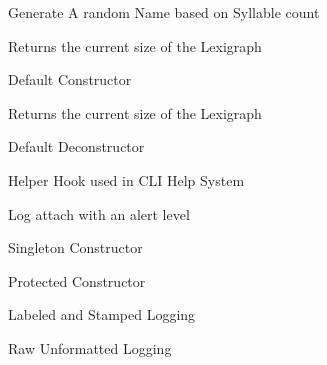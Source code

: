 \begin{DoxyRefList}
%
Generate A random Name based on Syllable count  
\item[Member \mbox{\hyperlink{classLexicon_afd43c6e75ae64e241631d6d8d4d47350}{Lexicon\+::get\+Lexigraph\+Size}} ()]\label{todo__todo000080}%
%
Returns the current size of the Lexigraph  
\item[Member \mbox{\hyperlink{classLexicon_aa62f83480879f9c6489633cb83a0736f}{Lexicon\+::Lexicon}} ()]\label{todo__todo000078}%
%
Default Constructor  
\item[Member \mbox{\hyperlink{classLexicon_a3b19ad271a38917ebb7547ea3e6586dc}{Lexicon\+::set\+Lexigraph}} (std\+::string)]\label{todo__todo000081}%
%
Returns the current size of the Lexigraph  
\item[Member \mbox{\hyperlink{classLexicon_a3c7224c29de2b05503992938986fd665}{Lexicon\+::$\sim$\+Lexicon}} ()]\label{todo__todo000082}%
%
Default Deconstructor  
\item[Member \mbox{\hyperlink{classLogger_a4074bf3a723b9d886ef93bd9f55999ec}{Logger\+::\+\_\+help}} ()]\label{todo__todo000089}%
%
Helper Hook used in CLI Help System  
\item[Member \mbox{\hyperlink{classLogger_a2c05fb76cb7383df07e34a0795f69217}{Logger\+::alert\+\_\+log}} (std\+::string, std\+::string)]\label{todo__todo000085}%
%
Log attach with an alert level  
\item[Member \mbox{\hyperlink{classLogger_a58ba0fb326628410e7d67fe18d2e1fbf}{Logger\+::Get\+Instance}} ()]\label{todo__todo000084}%
%
Singleton Constructor  
\item[Member \mbox{\hyperlink{classLogger_abc41bfb031d896170c7675fa96a6b30c}{Logger\+::Logger}} ()]\label{todo__todo000083}%
%
Protected Constructor  
\item[Member \mbox{\hyperlink{classLogger_aa645cb6ba80081339f01b92d4738f196}{Logger\+::named\+\_\+log}} (std\+::string, std\+::string)]\label{todo__todo000086}%
%
Labeled and Stamped Logging  
\item[Member \mbox{\hyperlink{classLogger_a850c792e9a22c5bde830b3ea672ee52f}{Logger\+::raw\+\_\+log}} (std\+::string)]\label{todo__todo000087}%
%
Raw Unformatted Logging  
\item[Member \mbox{\hyperlink{classLogger_a031840b005d6689cb7994695036b0921}{Logger\+::timed\+\_\+log}} (std\+::string)]\label{todo__todo000088}%

\end{DoxyRefList}
